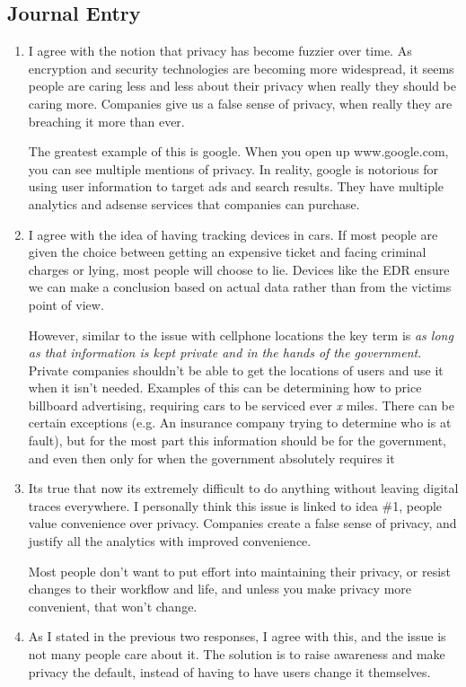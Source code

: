 \documentclass{scrartcl}
\begin{document}
\subsection{Journal Entry}
\label{sec:orgfd4dc31}
\begin{enumerate}
\item I agree with the notion that privacy has become fuzzier over time. As
encryption and security technologies are becoming more widespread, it seems
people are caring less and less about their privacy when really they should
be caring more. Companies give us a false sense of privacy, when really they
are breaching it more than ever.

The greatest example of this is google. When you open up www.google.com, you
can see multiple mentions of privacy. In reality, google is notorious for
using user information to target ads and search results. They have multiple
analytics and adsense services that companies can purchase.

\item I agree with the idea of having tracking devices in cars. If most people are
given the choice between getting an expensive ticket and facing criminal
charges or lying, most people will choose to lie. Devices like the EDR ensure
we can make a conclusion based on actual data rather than from the victims
point of view.

However, similar to the issue with cellphone locations  the key term is \emph{as
long as that information is kept private and in the hands of the government}.
Private companies shouldn't be able to get the locations of users and use it
when it isn't needed. Examples of this can be determining how to price
billboard advertising, requiring cars to be serviced ever \emph{x} miles.  There can
be certain exceptions (e.g. An insurance company trying to determine who is
at fault), but for the most part this information should be for the
government, and even then only for when the government absolutely requires it

\item Its true that now its extremely difficult to do anything without leaving
digital traces everywhere. I personally think this issue is linked to idea
\#1, people value convenience over privacy. Companies create a false sense of
privacy, and justify all the analytics with improved convenience.

Most people don't want to put effort into maintaining their privacy, or
resist changes to their workflow and life, and unless you make privacy more
convenient, that won't change.

\item As I stated in the previous two responses, I agree with this, and the issue
is not many people care about it. The solution is to raise awareness and make
privacy the default, instead of having to have users change it themselves.
\end{enumerate}
\end{document}
